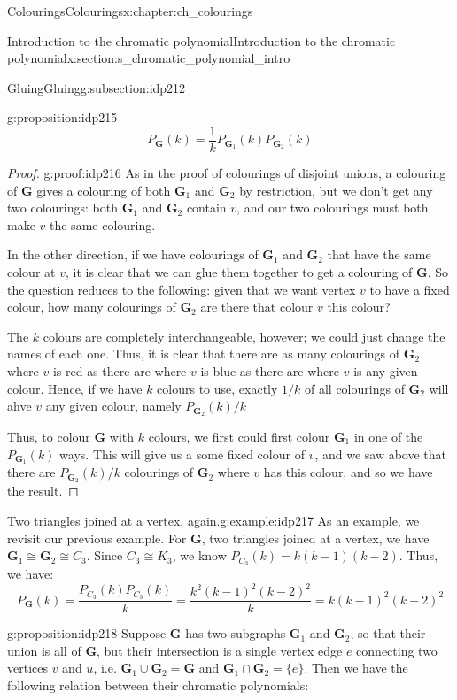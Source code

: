 \documentclass[oneside,10pt,]{book}
\numberwithin{equation}{section}
\newcommand{\bfG}{\mathbf{G}}
\begin{document}
\begin{chapterptx}{Colourings}{}{Colourings}{}{}{x:chapter:ch_colourings}
\begin{sectionptx}{Introduction to the chromatic polynomial}{}{Introduction to the chromatic polynomial}{}{}{x:section:s_chromatic_polynomial_intro}
\begin{subsectionptx}{Gluing}{}{Gluing}{}{}{g:subsection:idp212}
\begin{proposition}{}{}{g:proposition:idp215}
%
\begin{equation*}
P_{\bfG}(k)=\frac{1}{k}P_{\bfG_1}(k)P_{\bfG_2}(k)
\end{equation*}
\end{proposition}
\begin{proof}{}{g:proof:idp216}
As in the proof of colourings of disjoint unions, a colouring of \(\bfG\) gives a colouring of both \(\bfG_1\) and \(\bfG_2\) by restriction, but we don't get any two colourings: both \(\bfG_1\) and \(\bfG_2\) contain \(v\), and our two colourings must both make \(v\) the same colouring.%
\par
In the other direction, if we have colourings of \(\bfG_1\) and \(\bfG_2\) that have the same colour at \(v\), it is clear that we can glue them together to get a colouring of \(\bfG\).  So the question reduces to the following: given that we want vertex \(v\) to have a fixed colour, how many colourings of \(\bfG_2\) are there that colour \(v\) this colour?%
\par
The \(k\) colours are completely interchangeable, however; we could just change the names of each one.  Thus, it is clear that there are as many colourings of \(\bfG_2\) where \(v\) is red as there are where \(v\) is blue as there are where \(v\) is any given colour.  Hence, if we have \(k\) colours to use, exactly \(1/k\) of all colourings of \(\bfG_2\) will ahve \(v\) any given colour, namely \(P_{\bfG_2}(k)/k\)%
\par
Thus, to colour \(\bfG\) with \(k\) colours, we first could first colour \(\bfG_1\) in one of the \(P_{\bfG_1}(k)\) ways.  This will give us a some fixed colour of \(v\), and we saw above that there are \(P_{\bfG_2}(k)/k\) colourings of \(\bfG_2\) where \(v\) has this colour, and so we have the result.%
\end{proof}
\begin{example}{Two triangles joined at a vertex, again.}{g:example:idp217}%
As an example, we revisit our previous example.  For \(\bfG\), two triangles joined at a vertex, we have \(\bfG_1\cong \bfG_2\cong C_3\).  Since \(C_3\cong K_3\), we know \(P_{C_3}(k)=k(k-1)(k-2)\).  Thus, we have:%
%
\begin{equation*}
P_\bfG(k)=\frac{P_{C_3}(k)P_{C_3}(k)}{k}=\frac{k^2(k-1)^2(k-2)^2}{k}=k(k-1)^2(k-2)^2
\end{equation*}
\end{example}
\begin{proposition}{}{}{g:proposition:idp218}%
Suppose \(\bfG\) has two subgraphs \(\bfG_1\) and \(\bfG_2\), so that their union is all of \(\bfG\), but their intersection is a single vertex edge \(e\) connecting two vertices \(v\) and \(u\), i.e. \(\bfG_1\cup\bfG_2=\bfG\) and \(\bfG_1\cap\bfG_2=\{e\}\).  Then we have the following relation between their chromatic polynomials:%

\end{proposition}
\end{subsectionptx}
\end{sectionptx}
\end{chapterptx}
\end{document}
